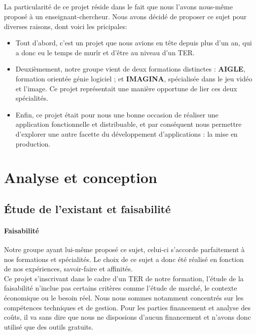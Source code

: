 \documentclass{report}
\begin{document}
		\paragraph{}
		La particularité de ce projet réside dans le fait que nous l'avons nous-même proposé à un enseignant-chercheur. Nous avons décidé de proposer ce sujet pour diverses raisons, dont voici les pricipales:
		\begin{itemize}
			\item Tout d'abord, c'est un projet que nous avions en tête depuis plus d'un an, qui a donc eu le temps de murîr et d'être au niveau d'un TER.
			\item Deuxièmement, notre groupe vient de deux formations distinctes : \textbf{AIGLE}, formation orientée génie logiciel ; et \textbf{IMAGINA}, spécialisée dans le jeu vidéo et l'image. Ce projet représentait une manière opportune de lier ces deux spécialités.
			\item Enfin, ce projet était pour nous une bonne occasion de réaliser une application fonctionnelle et distribuable, et par conséquent nous permettre d'explorer une autre facette du développement d'applications : la mise en production.
		\end{itemize}	

	\chapter{Analyse et conception}
		\section{Étude de l'existant et faisabilité}
		\subsubsection{Faisabilité}
		Notre groupe ayant lui-même proposé ce sujet, celui-ci s'accorde parfaitement à nos formations et spécialités. Le choix de ce sujet a donc été réalisé en fonction de nos expériences, savoir-faire et affinités.\\
Ce projet s'inscrivant dans le cadre d'un TER de notre formation, l'étude de la faisabilité n'inclue pas certains critères comme l'étude de marché, le contexte économique ou le besoin réel. 
Nous nous sommes notamment concentrés sur les compétences techniques et de gestion. Pour les parties financement et analyse des coûts, il va sans dire que nous ne disposions d'aucun financement et n'avons donc utilisé que des outils gratuits. \\
\end{document}
